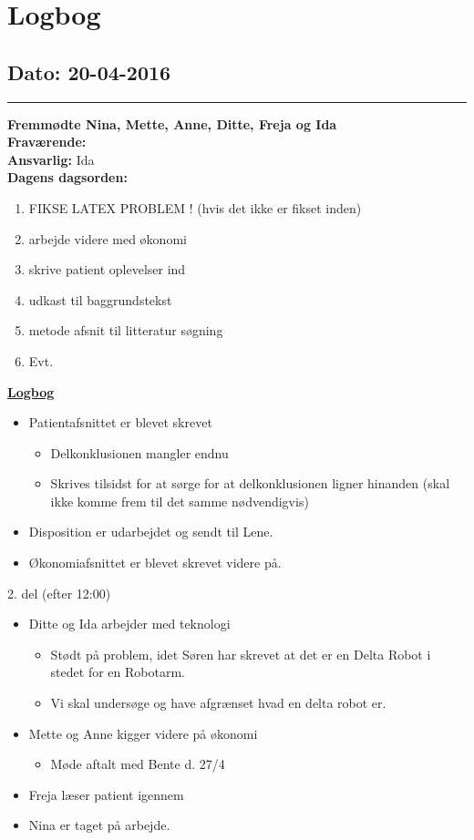 \chapter{Logbog}
\section{Dato: 20-04-2016}
\hrule
\textbf{Fremmødte Nina, Mette, Anne, Ditte, Freja og Ida } \\
\textbf{Fraværende: } \\
\textbf{Ansvarlig:} Ida  \\
\textbf{Dagens dagsorden: }
\begin{enumerate}
	\item FIKSE LATEX PROBLEM ! (hvis det ikke er fikset inden)
	\item arbejde videre med økonomi
	\item skrive patient oplevelser ind
	\item udkast til baggrundstekst
	\item metode afsnit til litteratur søgning
	\item Evt. 
\end{enumerate}

\underline{\textbf{Logbog}}
\begin{itemize}
\item Patientafsnittet er blevet skrevet
\begin{itemize}
\item Delkonklusionen mangler endnu 
\item Skrives tilsidst for at sørge for at delkonklusionen ligner hinanden (skal ikke komme frem til det samme nødvendigvis)
\end{itemize}
\item Disposition er udarbejdet og sendt til Lene.
\item Økonomiafsnittet er blevet skrevet videre på.
\end{itemize}
2. del (efter 12:00)
\begin{itemize}
\item Ditte og Ida arbejder med teknologi
\begin{itemize}
\item Stødt på problem, idet Søren har skrevet at det er en Delta Robot i stedet for en Robotarm.
\item Vi skal undersøge og have afgrænset hvad en delta robot er.
\end{itemize}
\item Mette og Anne kigger videre på økonomi
\begin{itemize}
\item Møde aftalt med Bente d. 27/4
\end{itemize}
\item Freja læser patient igennem
\item Nina er taget på arbejde.
\end{itemize}
\newpage